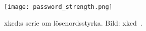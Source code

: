 \documentclass{beamer}
\begin{document}
\begin{frame}
  \begin{figure}
    \texttt{[image: password\_strength.png]}
    \caption{xkcd:s serie om lösenordsstyrka.
    Bild: xkcd~\cite{xkcd936}.}
  \end{figure}
\end{frame}

%
%
%
%
%
%
%
\end{document}
